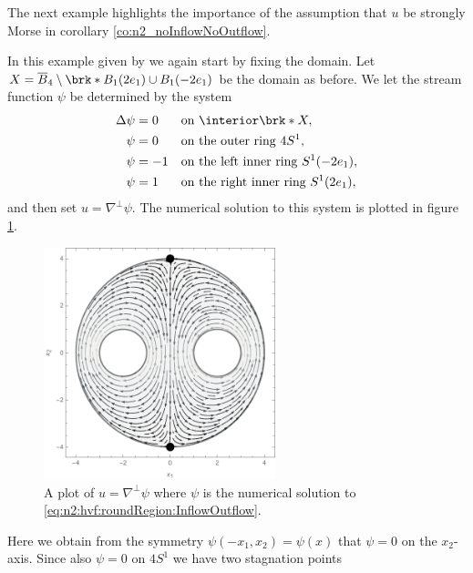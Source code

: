 The next example highlights the importance of the assumption that $u$ be strongly Morse in corollary \ref{co:n2_noInflowNoOutflow}.
\begin{example}\label{ex:n2_noInflowOutflow_irregular}
  In this example given by \cite{Wahlen2023} we again start by fixing the domain.
  Let $X=\overline{B}_4\setminus\brk*{B_1(2e_1)\cup B_1(-2e_1)}$ be the domain as before.
  We let the stream function $\psi$ be determined by the system
  \begin{equation}
    \begin{aligned}
      \Delta \psi&=0 &&\text{on }\openX, \\
      \psi&=0 &&\text{on the outer ring }4S^1, \\
      \psi&=-1 &&\text{on the left inner ring }S^1(-2e_1), \\
      \psi&=1 &&\text{on the right inner ring }S^1(2e_1),
    \end{aligned}\label{eq:n2:hvf:roundRegion:InflowOutflow}
  \end{equation}
  and then set $u=\nabla^\perp\psi$.
  The numerical solution to this system is plotted in figure \ref{pl:n2_hvf_roundRegion_InflowOutflow}.
  \begin{figure}[h]
    \centering
    \includegraphics[width=0.6\textwidth]{../Plots/n2_hvf_roundRegion_InflowOutflow_gray_2.pdf}
    \caption{A plot of $u=\nabla^\perp\psi$ where $\psi$ is the numerical solution to
    \eqref{eq:n2:hvf:roundRegion:InflowOutflow}.}
    \label{pl:n2_hvf_roundRegion_InflowOutflow}
  \end{figure}
  Here we obtain from the symmetry $\psi(-x_1,x_2)=\psi(x)$ that $\psi=0$ on
  the $x_2$-axis. Since also $\psi=0$ on $4S^1$ we have two stagnation points

\end{example}
